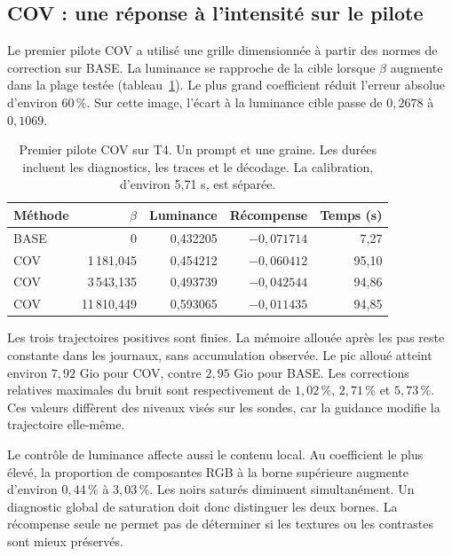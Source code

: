 \documentclass[11pt,a4paper]{article}
\begin{document}
\subsection{COV : une réponse à l'intensité sur le pilote}
Le premier pilote COV a utilisé une grille dimensionnée à partir des normes de correction sur BASE. La luminance se rapproche de la cible lorsque $\beta$ augmente dans la plage testée (tableau~\ref{tab:covinitial}). Le plus grand coefficient réduit l'erreur absolue d'environ 60\,\%. Sur cette image, l'écart à la luminance cible passe de $0{,}2678$ à $0{,}1069$.
\begin{table}[htbp]
\centering\small
\begin{tabular}{lrrrr}
\toprule
Méthode & $\beta$ & Luminance & Récompense & Temps (s)\\
\midrule
BASE & 0 & 0,432205 & $-0,071714$ & 7,27\\
COV & 1\,181,045 & 0,454212 & $-0,060412$ & 95,10\\
COV & 3\,543,135 & 0,493739 & $-0,042544$ & 94,86\\
COV & 11\,810,449 & 0,593065 & $-0,011435$ & 94,85\\
\bottomrule
\end{tabular}
\caption{Premier pilote COV sur T4. Un prompt et une graine. Les durées incluent les diagnostics, les traces et le décodage. La calibration, d'environ 5,71 s, est séparée.}
\label{tab:covinitial}
\end{table}

Les trois trajectoires positives sont finies. La mémoire allouée après les pas reste constante dans les journaux, sans accumulation observée. Le pic alloué atteint environ $7{,}92$ Gio pour COV, contre $2{,}95$ Gio pour BASE. Les corrections relatives maximales du bruit sont respectivement de $1{,}02$\,\%, $2{,}71$\,\% et $5{,}73$\,\%. Ces valeurs diffèrent des niveaux visés sur les sondes, car la guidance modifie la trajectoire elle-même.

Le contrôle de luminance affecte aussi le contenu local. Au coefficient le plus élevé, la proportion de composantes RGB à la borne supérieure augmente d'environ $0{,}44$\,\% à $3{,}03$\,\%. Les noirs saturés diminuent simultanément. Un diagnostic global de saturation doit donc distinguer les deux bornes. La récompense seule ne permet pas de déterminer si les textures ou les contrastes sont mieux préservés.
\end{document}
